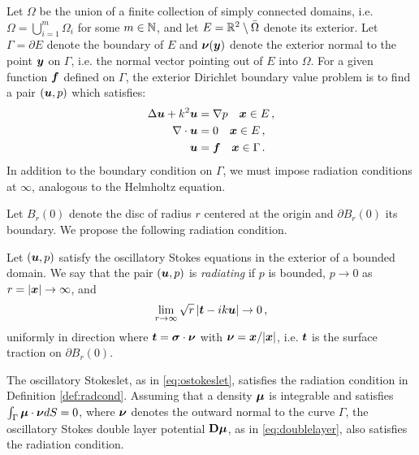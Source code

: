 Let $\Omega$ be the union of a finite collection of
simply connected domains, i.e. $\Omega = \bigcup_{i=1}^m \Omega_i$
for some $m \in \mathbb{N}$,
and let $E = \mathbb{R}^{2} \setminus \bar{\Omega}$ denote its
exterior.
%
Let $\Gamma = \partial E$ denote the boundary of $E$ and
${\boldsymbol \nu}({\boldsymbol y})$ denote the exterior normal to the point ${\boldsymbol y}$ on
$\Gamma$, i.e. the normal vector pointing out of $E$ into $\Omega$.
%
For a given function ${\boldsymbol f}$ defined on $\Gamma$,
the exterior Dirichlet boundary value problem is to
find a pair $({\boldsymbol u},p)$ which satisfies:
\begin{equation}
\begin{aligned}
\Delta {\boldsymbol u} + k^{2} {\boldsymbol u} &= \nabla p \quad {\boldsymbol x} \in E \, ,\\
\nabla \cdot {\boldsymbol u} &= 0 \quad {\boldsymbol x} \in E \, ,  \\
{\boldsymbol u} &= {\boldsymbol f} \quad {\boldsymbol x} \in \Gamma \, . \nonumber
\end{aligned}
\end{equation}
In addition to the boundary condition on
$\Gamma$, we must impose radiation conditions
at $\infty$, analogous to the Helmholtz equation.
%

Let $B_r(0)$ denote the disc of radius $r$ centered
at the origin and $\partial B_r(0)$ its boundary.
%
We propose the following radiation condition.

\begin{definition} \label{def:radcond}
Let $({\boldsymbol u},p)$ satisfy the oscillatory Stokes equations in
the exterior of a bounded domain. We say that
the pair $({\boldsymbol u},p)$ is {\em radiating} if
$p$ is bounded, $p \to 0$ as $r = |{\boldsymbol x}| \to \infty$, and 
\begin{equation}
\lim_{r\to \infty} \sqrt{r} \left| {\boldsymbol t} - i k {\boldsymbol u} \right| \to 0 \, ,
\label{eq:radcond}
\end{equation}
uniformly in direction where ${\boldsymbol t} = {\boldsymbol \sigma} \cdot {\boldsymbol \nu}$
with ${\boldsymbol \nu} = {\boldsymbol x}/|{\boldsymbol x}|$, i.e. ${\boldsymbol t}$ is the surface
traction on $\partial B_r(0)$.     
\end{definition}

\begin{proposition}
The oscillatory Stokeslet, as in \eqref{eq:ostokeslet}, satisfies
the radiation condition in Definition \ref{def:radcond}.
Assuming that a density ${\boldsymbol \mu}$ is integrable and satisfies
$\int_\Gamma {\boldsymbol \mu}\cdot {\boldsymbol \nu} dS = 0$, where ${\boldsymbol \nu}$ denotes the
outward normal to the curve $\Gamma$, the oscillatory Stokes
double layer potential ${\bf D}{\boldsymbol \mu}$, as in \eqref{eq:doublelayer},
also satisfies the radiation condition.
\end{proposition}

